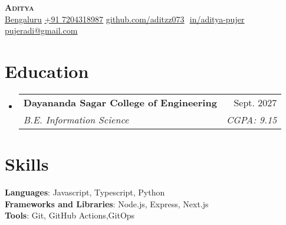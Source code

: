 \documentclass[letterpaper,11pt]{article}
\makeatletter
\newcommand{\resumeSubheading}[4]{
  \vspace{-2pt}\item
    \begin{tabular*}{0.97\textwidth}[t]{l@{\extracolsep{\fill}}r}
      \textbf{#1} & #2 \\
      \textit{\small#3} & \textit{\small #4} \\
    \end{tabular*}\vspace{-7pt}
}
\newcommand{\resumeSubHeadingListStart}{\begin{itemize}[leftmargin=0.15in, label={}]}
\newcommand{\resumeSubHeadingListEnd}{\end{itemize}}
\makeatother
\begin{document}
\begin{flushright}
  \color{gray}
  \item
\end{flushright}

\vspace{-16.5pt}

\begin{center}
    \textbf{\Huge \scshape Aditya} \\ \vspace{8pt}
    \small 
                         \href{https://www.google.com/maps/place/bengaluru/data=!4m2!3m1!…}
    {\underline{Bengaluru}}
    \href{tel:+917204328987}
    {\underline{+91 7204318987}}
    \href{https://github.com/aditzz073}{\underline{github.com/aditzz073}} $  $
    \href{https://linkedin.com/in/aditya-pujer}{\underline{in/aditya-pujer}} $  $
    \href{mailto:pujeradi@gmail.com}
    {\underline{pujeradi@gmail.com}}
    
\end{center}

\section{Education}
  \resumeSubHeadingListStart
  
    \resumeSubheading
      {Dayananda Sagar College of Engineering}{Sept. 2027}
      {B.E. Information Science}{CGPA: 9.15}
  \resumeSubHeadingListEnd
\section{Skills}
 \begin{itemize}[leftmargin=0.15in, label={}]
    \small{\item{
    
     \textbf{Languages}{: Javascript, Typescript, Python} \\
     \textbf{Frameworks and Libraries}{: Node.js, Express, Next.js} \\
     
     \textbf{Tools}{: Git, GitHub Actions,GitOps}     
     
    }}
 \end{itemize}
 \vspace{-15pt}
 
\end{document}
